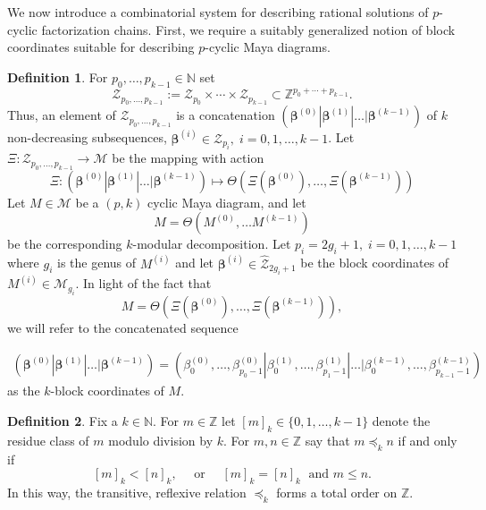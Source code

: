 \documentclass{amsart}
\theoremstyle{definition}
\newtheorem{definition}{Definition}
\newcommand{\N}{\mathbb{N}}
\newcommand{\Z}{\mathbb{Z}}
\newcommand{\bbeta}{{\boldsymbol{\beta}}}
\newcommand{\cM}{\mathcal{M}}
\newcommand{\cZ}{\mathcal{Z}}
\newcommand{\hcZ}{\hat{\cZ}}
\begin{document}



We now introduce a combinatorial system for describing rational
solutions of $p$-cyclic factorization chains.  First, we require a
suitably generalized notion of block coordinates suitable for
describing $p$-cyclic Maya diagrams.
\begin{definition}
  For $p_0,\ldots, p_{k-1} \in \N$ set
  \[ \cZ_{p_0,\ldots, p_{k-1}} := \cZ_{p_0} \times \cdots \times
    \cZ_{p_{k-1}}\subset \Z^{p_0+\cdots +p_{k-1}}. \] Thus, an element
  of $\cZ_{p_0,\ldots, p_{k-1}}$ is a concatenation
  $(\bbeta^{(0)} | \bbeta^{(1)} | \ldots | \bbeta^{(k-1)})$ of $k$
  non-decreasing subsequences,
  $\bbeta^{(i)} \in \cZ_{p_i},\; i=0,1,\ldots, k-1$.  Let
  $\Xi\colon \cZ_{p_0,\ldots, p_{k-1}} \to \cM$ be the mapping with
  action
  \[ \Xi \colon (\bbeta^{(0)} | \bbeta^{(1)} | \ldots |
    \bbeta^{(k-1)})\mapsto \Theta\left(\Xi(\bbeta^{(0)}), \ldots ,
      \Xi(\bbeta^{(k-1)})\right) \] Let $M\in \cM$ be a $(p,k)$ cyclic
  Maya diagram, and let
  \[M=\Theta\left(M^{(0)},\ldots M^{(k-1)}\right)\] be the
  corresponding $k$-modular decomposition.  Let
  $p_i = 2g_i+1,\; i=0,1,\ldots, k-1$ where $g_i$ is the genus of
  $M^{(i)}$ and let $\bbeta^{(i)}\in \hcZ_{2g_i+1}$ be the block
  coordinates of $M^{(i)}\in \cM_{g_i}$.  In light of the fact that
  \[ M = \Theta\left(\Xi(\bbeta^{(0)}), \ldots , \Xi(\bbeta^{(k-1)})\right),\]
  we will refer to the  concatenated sequence
  
  \begin{align*}
    (\bbeta^{(0)} | \bbeta^{(1)} | \ldots |
    \bbeta^{(k-1)}) =  \left( \beta^{(0)}_{0}, \ldots, \beta^{(0)}_{p_0-1} |
    \beta^{(1)}_{0}, \ldots, \beta^{(1)}_{p_1-1} 
    | \ldots | \beta^{(k-1)}_{0},\ldots, \beta^{(k-1)}_{p_{k-1}-1}\right) 
  \end{align*}
  as the $k$-block coordinates of $M$.
\end{definition}


\begin{definition}
  Fix a $k\in \N$. For $m\in \Z$ let $[m]_k\in \{ 0,1,\ldots, k-1 \}$
  denote the residue class of $m$ modulo division by $k$.  For
  $m,n \in \Z$ say that $m \preccurlyeq_k n$ if and only if
  \[ [m]_k < [n]_k,\quad \text{ or } \quad [m]_k = [n]_k\; \text{ and
  } m\leq n.\]
  In this way, the transitive, reflexive relation $\preccurlyeq_k$
  forms a total order on $\Z$.
\end{definition}
\end{document}
